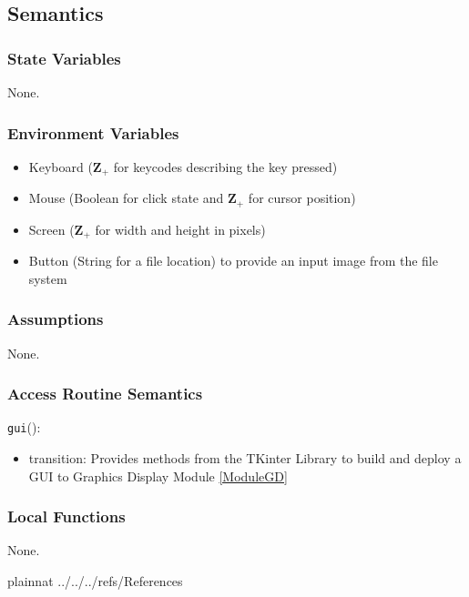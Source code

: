 \documentclass[12pt, titlepage]{article}
\def\code#1{\texttt{#1}}
\begin{document}
\subsection{Semantics}

\subsubsection{State Variables}

None.

\subsubsection{Environment Variables}

\begin{itemize}
  \item Keyboard ($\mathbf{Z}_{+}$ for keycodes describing the key pressed)
  \item Mouse (Boolean for click state and  $\mathbf{Z}_{+}$ for cursor position)
  \item Screen ($\mathbf{Z}_{+}$ for width and height in pixels)
  \item Button (String for a file location) to provide an input image from the file system
\end{itemize}

\subsubsection{Assumptions}

None.

\subsubsection{Access Routine Semantics}

\noindent \code{gui}():
\begin{itemize}
\item transition: Provides methods from the TKinter Library to build and deploy a GUI to Graphics Display Module \ref{ModuleGD}
\end{itemize}

\subsubsection{Local Functions}

None.
  
\newpage

 {plainnat}
 {../../../refs/References}
\end{document}
